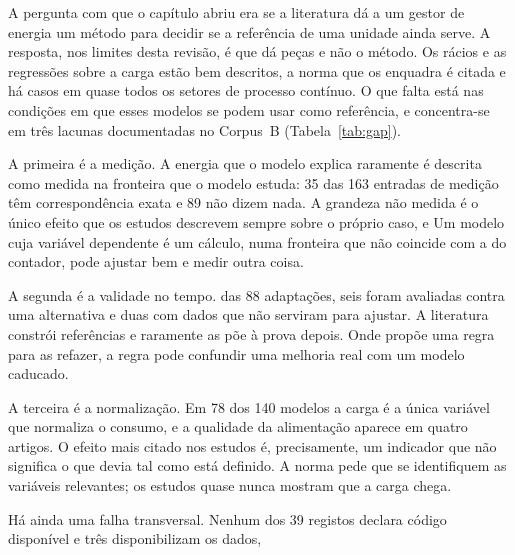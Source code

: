 A pergunta com que o capítulo abriu era se a literatura dá a um gestor de
energia um método para decidir se a referência de uma unidade ainda serve.
A resposta, nos limites desta revisão, é que dá peças e não o método. Os
rácios e as regressões sobre a carga estão bem descritos, a norma que os
enquadra é citada e há casos em quase todos os setores de processo contínuo.
O que falta está nas condições em que esses modelos se podem usar como
referência, e concentra-se em três lacunas documentadas no Corpus~B
(Tabela~\ref{tab:gap}).

A primeira é a medição. A energia que o modelo explica raramente é descrita
como medida na fronteira que o modelo estuda: 35 das 163 entradas de medição
têm correspondência exata e 89 não dizem nada. A grandeza não medida é o
único efeito que os estudos descrevem sempre sobre o próprio caso, e  Um modelo cuja
variável dependente é um cálculo, numa fronteira que não coincide com a do
contador, pode ajustar bem e medir outra coisa.

A segunda é a validade no tempo.  das 88 adaptações, seis foram avaliadas contra uma alternativa e
duas com dados que não serviram para ajustar. A literatura constrói
referências e raramente as põe à prova depois. Onde propõe uma regra para as
refazer, a regra pode confundir uma melhoria real com um modelo caducado.

A terceira é a normalização. Em 78 dos 140 modelos a carga é a única
variável que normaliza o consumo, e a qualidade da alimentação aparece em
quatro artigos. O efeito mais citado nos estudos é, precisamente, um
indicador que não significa o que devia tal como está definido. A norma pede
que se identifiquem as variáveis relevantes; os estudos quase nunca mostram
que a carga chega.

Há ainda uma falha transversal. Nenhum dos 39 registos declara código
disponível e três disponibilizam os dados, 

